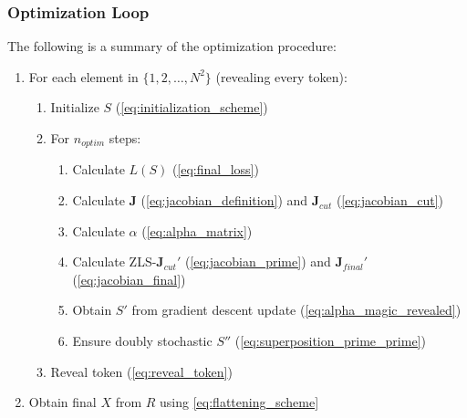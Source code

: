\subsubsection{Optimization Loop}%
\label{ssub:optimization_loop}
The following is a summary of the optimization procedure:
\begin{enumerate}
        \item For each element in $\{1,2,\ldots,N^2\}$ (revealing every token):
    \begin{enumerate}
    \item Initialize $S$ (\autoref{eq:initialization_scheme})
            \item For $n_{optim}$ steps:
    \begin{enumerate}
        \item Calculate $L(S)$ (\autoref{eq:final_loss})
        \item Calculate $\bm{J}$ (\autoref{eq:jacobian_definition}) and $\bm{J}_{cut}$ (\autoref{eq:jacobian_cut})
        \item Calculate $\alpha$ (\autoref{eq:alpha_matrix})
        \item Calculate ZLS-$\bm{J}_{cut}'$ (\autoref{eq:jacobian_prime}) and $\bm{J}_{final}'$ (\autoref{eq:jacobian_final})
        \item Obtain $S'$ from gradient descent update (\autoref{eq:alpha_magic_revealed})
        \item Ensure doubly stochastic $S''$ (\autoref{eq:superposition_prime_prime})
    \end{enumerate}
    \item Reveal token (\autoref{eq:reveal_token})
        \end{enumerate}
    \item Obtain final $X$ from $R$ using \autoref{eq:flattening_scheme}
\end{enumerate}

